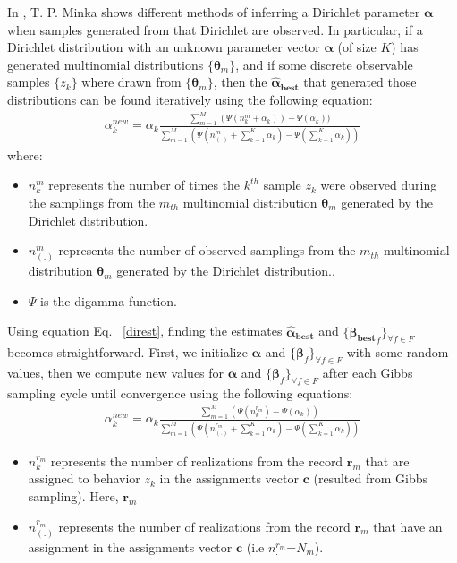 In \cite{diring}, T. P. Minka shows different methods of inferring a Dirichlet parameter $\boldsymbol{\alpha}$ when samples generated from that Dirichlet are observed. In particular, if a Dirichlet distribution with an unknown parameter vector $\boldsymbol{\alpha}$ (of size $K$) has generated multinomial distributions $\{\boldsymbol{\theta}_{m}\}$, and if some discrete observable samples $\{z_{k}\}$ where drawn from $\{\boldsymbol{\theta}_{m}\}$, then the $\boldsymbol{\widehat{\alpha}_{best}}$ that generated those distributions can be found iteratively using the following equation:
\begin{equation}\label{direst}
\begin{split} 
\alpha_{k}^{new}= \alpha_{k} \frac{\sum_{m=1}^{M}(\Psi (n^{m}_{k}+\alpha_{k}))-\Psi (\alpha_{k}))}{\sum_{m=1}^{M}(\Psi (n^{m}_{(.)}+\sum_{k=1}^{K}\alpha _{k})-\Psi (\sum_{k=1}^{K}\alpha _{k}))}
\end{split} 
\end{equation}
where:
\begin{itemize} 
	\item $n^{m}_{k}$ represents the number of times the $k^{th}$ sample $z_{k}$ were observed during the samplings from the $m_{th}$ multinomial distribution   $\boldsymbol{\theta}_{m}$ generated by the Dirichlet distribution.
	\item $n^{m}_{(.)}$ represents the number of observed samplings from the $m_{th}$ multinomial distribution   $\boldsymbol{\theta}_{m}$ generated by the Dirichlet distribution..
	\item  $\Psi$ is the digamma function.
\end{itemize}

Using equation Eq. ~\eqref{direst}, finding the estimates $\boldsymbol{\widehat{\alpha}_{best}}$ and $\{\boldsymbol{\widehat{\beta }_{best}}_{f}\}_{\forall f\in F}$ becomes straightforward. First, we initialize  $\boldsymbol{\alpha}$ and $\{\boldsymbol{\beta }_{f}\}_{\forall f\in F}$ with some random values, then we compute new values for $\boldsymbol{\alpha}$ and $\{\boldsymbol{\beta }_{f}\}_{\forall f\in F}$ after each Gibbs sampling cycle until convergence using the following equations:
\begin{equation}\label{alphaest}
\begin{split} 
\alpha_{k}^{new}= \alpha_{k} \frac{\sum_{m=1}^{M}(\Psi (n^{r_{m}}_{k})-\Psi (\alpha_{k}))}{\sum_{m=1}^{M}(\Psi (n^{r_{m}}_{(.)}+\sum_{k=1}^{K}\alpha _{k})-\Psi (\sum_{k=1}^{K}\alpha _{k}))}
\end{split} 
\end{equation}
\begin{itemize} 
	\item  $n^{r_{m}}_{k}$ represents the number of realizations from the record $\mathbf{r}_{m}$ that are assigned to behavior $z_{k}$ in the assignments vector $\mathbf{c}$ (resulted from Gibbs sampling). Here, $\mathbf{r}_{m}$
	\item  $n^{r_{m}}_{(.)}$ represents the number of realizations from the record $\mathbf{r}_{m}$ that have an assignment in the assignments vector $\mathbf{c}$ (i.e $n^{r_{m}}_{.}$=$N_{m}$).
\end{itemize}

